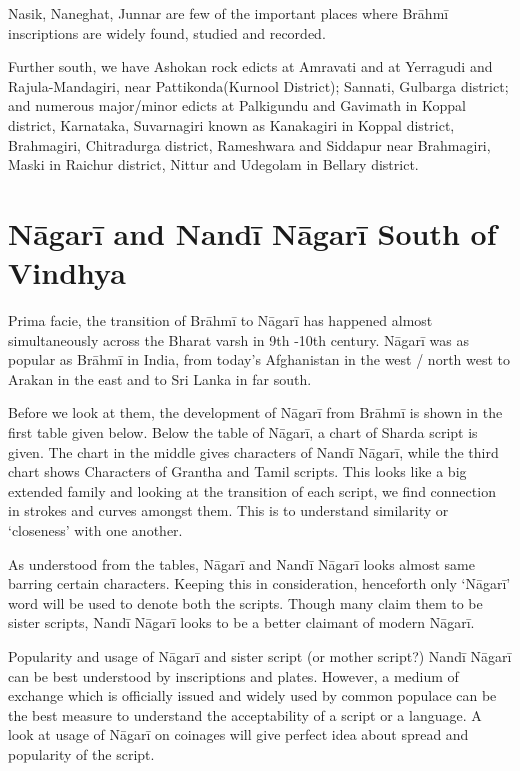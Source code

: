Nasik, Naneghat, Junnar are few of the important places where Brāhmī inscriptions are widely found, studied and recorded.

Further south, we have Ashokan rock edicts at Amravati and at Yerragudi and Rajula-Mandagiri, near Pattikonda(Kurnool District); Sannati, Gulbarga district; and numerous major/minor edicts at Palkigundu and Gavimath in Koppal district, Karnataka, Suvarnagiri known as Kanakagiri in Koppal district, Brahmagiri, Chitradurga district, Rameshwara and Siddapur near Brahmagiri, Maski in Raichur district, Nittur and Udegolam in Bellary district.


\section*{Nāgarī and Nandī Nāgarī South of Vindhya}

Prima facie, the transition of Brāhmī to Nāgarī has happened almost simultaneously across the Bharat varsh in 9th -10th century. Nāgarī was as popular as Brāhmī in India, from today’s Afghanistan in the west / north west to Arakan in the east and to Sri Lanka in far south.

Before we look at them, the development of Nāgarī from Brāhmī is shown in the first table given below. Below the table of Nāgarī, a chart of Sharda script is given. The chart in the middle gives characters of Nandī Nāgarī, while the third chart shows Characters of Grantha and Tamil scripts. This looks like a big extended family and looking at the transition of each script, we find connection in strokes and curves amongst them. This is to understand similarity or ‘closeness’ with one another.

As understood from the tables, Nāgarī and Nandī Nāgarī looks almost same barring certain characters. Keeping this in consideration, henceforth only ‘Nāgarī’ word will be used to denote both the scripts. Though many claim them to be sister scripts, Nandī Nāgarī looks to be a better claimant of modern Nāgarī.

Popularity and usage of Nāgarī and sister script (or mother script?) Nandī Nāgarī can be best understood by inscriptions and plates. However, a medium of exchange which is officially issued and widely used by common populace can be the best measure to understand the acceptability of a script or a language. A look at usage of Nāgarī on coinages will give perfect idea about spread and popularity of the script.

